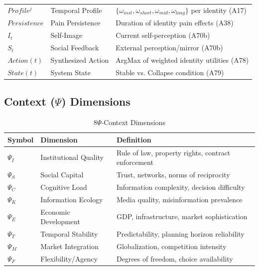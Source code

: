 \begin{longtable}{@{}lp{4cm}p{7cm}@{}}
\addlinespace
$Profile^j$ & Temporal Profile & $\{\omega_{inst}, \omega_{short}, \omega_{mid}, \omega_{long}\}$ per identity (A17) \\
$Persistence$ & Pain Persistence & Duration of identity pain effects (A38) \\
\addlinespace
$I_t$ & Self-Image & Current self-perception (A70b) \\
$S_t$ & Social Feedback & External perception/mirror (A70b) \\
$Action(t)$ & Synthesized Action & ArgMax of weighted identity utilities (A78) \\
$State(t)$ & System State & Stable vs. Collapse condition (A79) \\

\end{longtable}

\subsection{Context ($\Psi$) Dimensions}

\begin{longtable}{@{}lp{4cm}p{7cm}@{}}
\caption{8$\Psi$-Context Dimensions} \\
\toprule
\textbf{Symbol} & \textbf{Dimension} & \textbf{Definition} \\
\midrule
\endfirsthead
\midrule
\endhead
\bottomrule
\endlastfoot

$\Psi_I$ & Institutional Quality & Rule of law, property rights, contract enforcement \\
$\Psi_S$ & Social Capital & Trust, networks, norms of reciprocity \\
$\Psi_C$ & Cognitive Load & Information complexity, decision difficulty \\
$\Psi_K$ & Information Ecology & Media quality, misinformation prevalence \\
$\Psi_E$ & Economic Development & GDP, infrastructure, market sophistication \\
$\Psi_T$ & Temporal Stability & Predictability, planning horizon reliability \\
$\Psi_M$ & Market Integration & Globalization, competition intensity \\
$\Psi_F$ & Flexibility/Agency & Degrees of freedom, choice availability \\

\end{longtable}

